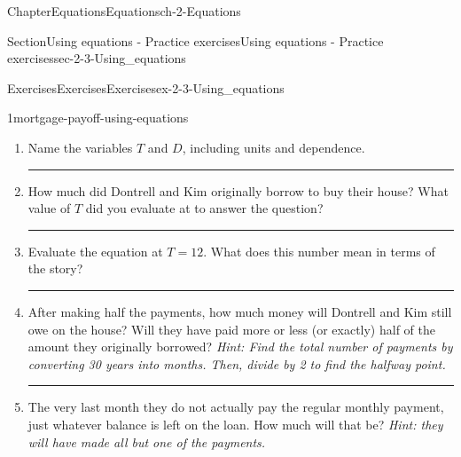 \documentclass[twoside,11pt,]{book}
\newlength{\workspacestrutwidth}
\numberwithin{equation}{section}
\newcommand{\amp}{&}
\begin{document}
\begin{chapterptx}{Chapter}{Equations}{}{Equations}{}{}{ch-2-Equations}
\begin{sectionptx}{Section}{Using equations - Practice exercises}{}{Using equations - Practice exercises}{}{}{sec-2-3-Using_equations}
\begin{exercises-subsection-numberless}{Exercises}{Exercises}{}{Exercises}{}{}{ex-2-3-Using_equations}
\begin{divisionexercise}{1}{}{}{mortgage-payoff-using-equations}
\begin{enumerate}[label=(\alph*),ref=\alph*]%
\item{}Name the variables \(T\) and \(D\), including units and dependence.%
\par
    \hspace{-2cm}
%
%
\par\rule{\workspacestrutwidth}{0in}%
\item\label{dontrell-kim-orig}How much did Dontrell and Kim originally borrow to buy their house? What value of \(T\) did you evaluate at to answer the question?%
\par\rule{\workspacestrutwidth}{0.75in}%
\item{}Evaluate the equation at \(T=12\). What does this number mean in terms of the story?%
\par\rule{\workspacestrutwidth}{0.75in}%
\item{}After making half the payments, how much money will Dontrell and Kim still owe on the house? Will they have paid more or less (or exactly) half of the amount they originally borrowed? \emph{Hint: Find the total number of payments by converting 30 years into months. Then, divide by 2 to find the halfway point.}%
\par\rule{\workspacestrutwidth}{0.75in}%
\item{}The very last month they do not actually pay the regular monthly payment, just whatever balance is left on the loan. How much will that be? \emph{Hint: they will have made all but one of the payments.}%

\end{enumerate}
\end{divisionexercise}
\end{exercises-subsection-numberless}
\end{sectionptx}
\end{chapterptx}
\end{document}
